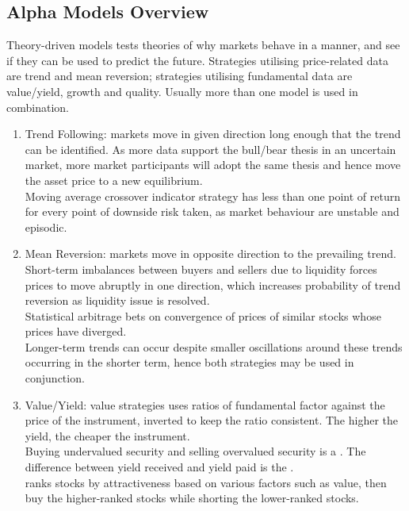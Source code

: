 \subsection{Alpha Models Overview}

Theory-driven models tests theories of why markets behave in a manner, and see if they can be used to predict the future. Strategies utilising price-related data are trend and mean reversion; strategies utilising fundamental data are value/yield, growth and quality. Usually more than one model is used in combination.

\begin{definition} 
\begin{enumerate}[label=\roman*.]
\setlength{\itemsep}{0pt}
\item Trend Following: markets move in given direction long enough that the trend can be identified. As more data support the bull/bear thesis in an uncertain market, more market participants will adopt the same thesis and hence move the asset price to a new equilibrium.\\
Moving average crossover indicator strategy has less than one point of return for every point of downside risk taken, as market behaviour are unstable and episodic.
\item Mean Reversion: markets move in opposite direction to the prevailing trend. Short-term imbalances between buyers and sellers due to liquidity forces prices to move abruptly in one direction, which increases probability of trend reversion as liquidity issue is resolved.\\
Statistical arbitrage bets on convergence of prices of similar stocks whose prices have diverged.\\
Longer-term trends can occur despite smaller oscillations around these trends occurring in the shorter term, hence both strategies may be used in conjunction.
\item Value/Yield:  value strategies uses ratios of fundamental factor against the price of the instrument, inverted to keep the ratio consistent. The higher the yield, the cheaper the instrument.\\
Buying undervalued security and selling overvalued security is a . The difference between yield received and yield paid is the .\\
 ranks stocks by attractiveness based on various factors such as value, then buy the higher-ranked stocks while shorting the lower-ranked stocks.

\end{enumerate}
\end{definition}
